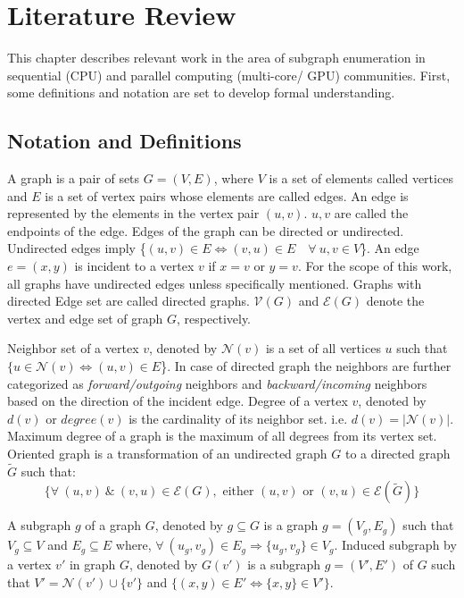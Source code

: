 \chapter{Literature Review}\label{chap:lit}

This chapter describes relevant work in the area of subgraph enumeration in sequential (CPU) and parallel computing (multi-core/ GPU) communities.
First, some definitions and notation are set to develop formal understanding.

\section{Notation and Definitions}
A graph is a pair of sets $G=(V,E)$, where $V$ is a set of elements called vertices and $E$ is a set of vertex pairs whose elements are called edges.
An edge is represented by the elements in the vertex pair $(u,v)$.
$u, v$ are called the endpoints of the edge.
Edges of the graph can be directed or undirected.
Undirected edges imply \{$(u,v)\in E \Leftrightarrow (v,u) \in E \quad \forall ~ u, v \in V$\}.
An edge $e = (x,y)$ is incident to a vertex $v$ if $x=v$ or $y=v$.
For the scope of this work, all graphs have undirected edges unless specifically mentioned.
Graphs with directed Edge set are called directed graphs.
$\mathcal{V}(G)$  and $\mathcal{E}(G)$ denote the vertex and edge set of graph $G$, respectively.

Neighbor set of a vertex $v$, denoted by $\mathcal{N}(v)$ is a set of all vertices $u$ such that $\{u \in \mathcal{N}(v) \Leftrightarrow (u,v) \in E$\}.
In case of directed graph the neighbors are further categorized as \textit{forward/outgoing} neighbors and \textit{backward/incoming} neighbors based on the direction of the incident edge.
Degree of a vertex $v$, denoted by $d(v)$ or $degree(v)$ is the cardinality of its neighbor set. i.e. $d(v)=|\mathcal{N}(v)|$.
Maximum degree of a graph is the maximum of all degrees from its vertex set.
Oriented graph is a transformation of an undirected graph $G$ to a directed graph $\tilde{G}$ such that: $$\{\forall~ (u,v) ~\& ~ (v,u) \in \mathcal{E}(G), \text{ either } (u,v) \text{ or } (v,u) \in \mathcal{E}(\tilde{G})\}$$


A subgraph $g$ of a graph $G$, denoted by $g \subseteq G$ is a graph $g=(V_g, E_g)$ such that $V_g \subseteq V$ and $E_g \subseteq E$ where, $\forall~ (u_g, v_g) \in E_g \Rightarrow \{u_g, v_g\} \in V_g$.
Induced subgraph by a vertex $v'$ in graph $G$, denoted by $G(v')$ is a subgraph $g=(V', E')$ of $G$ such that $V'=\mathcal{N}(v')\cup \{v'\}$ and $\{(x,y) \in E'\Leftrightarrow \{x,y\} \in V'\}$.

